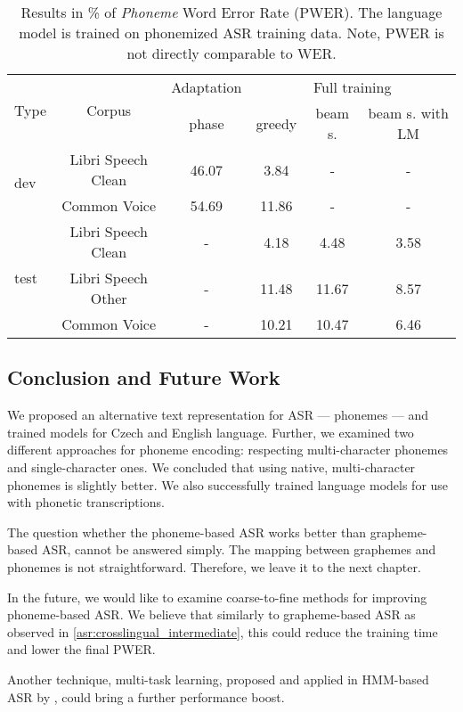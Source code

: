 \begin{table}[t]
	\centering
	\begin{tabular}{lc|c|ccc}
		\multirow{2}{*}{Type} & \multirow{2}{*}{Corpus} & Adaptation & \multicolumn{3}{c}{Full training} \\
		&                    &   phase    & greedy & beam s. & beam s. with LM \\ \hline
		\multirow{2}{*}{dev}   & Libri Speech Clean & 46.07 & 3.84   &      -       &           -          \\
		& Common Voice       & 54.69 & 11.86  &       -      &         -            \\ \hline
		\multirow{3}{*}{test} & Libri Speech Clean & -     & 4.18   & 4.48        & 3.58                \\
		& Libri Speech Other & -     & 11.48  & 11.67       & 8.57                \\
		& Common Voice       & -     & 10.21  & 10.47       & 6.46               
	\end{tabular}
	\caption[Results of English acoustic models]{Results in \% of \emph{Phoneme} Word Error Rate (PWER). The language model is trained on phonemized ASR training data. Note, PWER is not directly comparable to WER. }
	\label{tab:en_phon_results}
\end{table}


\subsection{Conclusion and Future Work}
We proposed an alternative text representation for ASR --- phonemes --- and trained models for Czech and English language. Further, we examined two different approaches for phoneme encoding: respecting multi-character phonemes and single-character ones. We concluded that using native, multi-character phonemes is slightly better. We also successfully trained language models for use with phonetic transcriptions. 

The question whether the phoneme-based ASR works better than grapheme-based ASR, cannot be answered simply. The mapping between graphemes and phonemes is not straightforward. Therefore, we leave it to the next chapter.

In the future, we would like to examine coarse-to-fine methods for improving phoneme-based ASR. We believe that similarly to grapheme-based ASR as observed in \cref{asr:crosslingual_intermediate}, this could reduce the training time and lower the final PWER. 

Another technique, multi-task learning, proposed and applied in HMM-based ASR by , could bring a further performance boost. 


